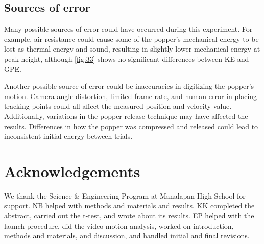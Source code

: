 \documentclass[reprint,amsmath,amssymb,aps,twoside]{revtex4-2} %
\begin{document}
\subsection{Sources of error}
Many possible sources of error could have occurred during this experiment. For example, air resistance could cause some of the popper’s mechanical energy to be lost as thermal energy and sound, resulting in slightly lower mechanical energy at peak height, although \cref{fig:33} shows no significant differences between KE and GPE.

Another possible source of error could be inaccuracies in digitizing the popper’s motion. Camera angle distortion, limited frame rate, and human error in placing tracking points could all affect the measured position and velocity value. Additionally, variations in the popper release technique may have affected the results. Differences in how the popper was compressed and released could lead to inconsistent initial energy between trials.




    
    
\section{Acknowledgements}
We thank the Science \& Engineering Program at Manalapan High School for support. NB helped with methods and materials and results.  KK completed the abstract, carried out the t-test, and wrote about its results. EP helped with the launch procedure, did the video motion analysis, worked on introduction, methods and materials, and discussion, and handled initial and final revisions.












\end{document}
